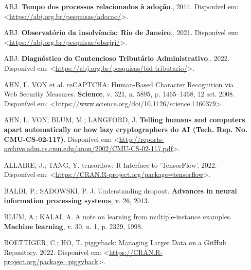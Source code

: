 \documentclass[12pt,twoside,brazilian]{book}
\newlength{\cslhangindent}
\newlength{\cslentryspacingunit} %
\newenvironment{CSLReferences}[2] %
 {%
  \setlength{\parindent}{0pt}
  \ifodd #1
  \let\oldpar\par
  \def\par{\hangindent=\cslhangindent\oldpar}
  \fi
  \setlength{\parskip}{#2\cslentryspacingunit}
 }%
 {}
\begin{document}

\hypertarget{refs}{}
\begin{CSLReferences}{0}{1}
\leavevmode{}%
ABJ. \textbf{Tempo dos processos relacionados à adoção}., 2014.
Disponível em:
\textless{}\url{https://abj.org.br/pesquisas/adocao/}\textgreater.

\leavevmode{}%
ABJ. \textbf{Observatório da insolvência: Rio de Janeiro}., 2021.
Disponível em:
\textless{}\url{https://abj.org.br/pesquisas/obsrjrj/}\textgreater.

\leavevmode{}%
ABJ. \textbf{Diagnóstico do Contencioso Tributário Administrativo}.,
2022. Disponível em:
\textless{}\url{https://abj.org.br/pesquisas/bid-tributario/}\textgreater.

\leavevmode{}%
AHN, L. VON et al. reCAPTCHA: Human-Based Character Recognition via Web
Security Measures. \textbf{Science}, v. 321, n. 5895, p. 1465--1468, 12
set. 2008. Disponível em:
\textless{}\url{https://www.science.org/doi/10.1126/science.1160379}\textgreater.

\leavevmode{}%
AHN, L. VON; BLUM, M.; LANGFORD, J. \textbf{Telling humans and computers
apart automatically or how lazy cryptographers do AI (Tech. Rep. No.
CMU-CS-02-117)}. Disponível em:
\textless{}\url{http://reports-archive.adm.cs.cmu.edu/anon/2002/CMU-CS-02-117.pdf}\textgreater.

\leavevmode{}%
ALLAIRE, J.; TANG, Y. tensorflow: R Interface to 'TensorFlow'. 2022.
Disponível em:
\textless{}\url{https://CRAN.R-project.org/package=tensorflow}\textgreater.

\leavevmode{}%
BALDI, P.; SADOWSKI, P. J. Understanding dropout. \textbf{Advances in
neural information processing systems}, v. 26, 2013.

\leavevmode{}%
BLUM, A.; KALAI, A. A note on learning from multiple-instance examples.
\textbf{Machine learning}, v. 30, n. 1, p. 2329, 1998.

\leavevmode{}%
BOETTIGER, C.; HO, T. piggyback: Managing Larger Data on a GitHub
Repository. 2022. Disponível em:
\textless{}\url{https://CRAN.R-project.org/package=piggyback}\textgreater.


\end{CSLReferences}
\end{document}
